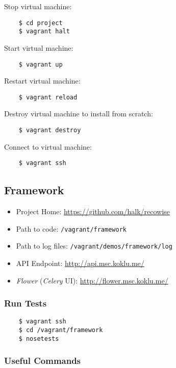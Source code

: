 Stop virtual machine:

\begin{verbatim}
    $ cd project
    $ vagrant halt
\end{verbatim}

Start virtual machine:

\begin{verbatim}
    $ vagrant up
\end{verbatim}

Restart virtual machine:

\begin{verbatim}
    $ vagrant reload
\end{verbatim}

Destroy virtual machine to install from scratch:

\begin{verbatim}
    $ vagrant destroy
\end{verbatim}

Connect to virtual machine:

\begin{verbatim}
    $ vagrant ssh
\end{verbatim}


\subsection{Framework}

\begin{itemize}
\item Project Home: \url{https://github.com/halk/recowise}
\item Path to code: \texttt{/vagrant/framework}
\item Path to log files: \texttt{/vagrant/demos/framework/log}
\item API Endpoint: \url{http://api.msc.koklu.me/}
\item \emph{Flower} (\emph{Celery} UI): \url{http://flower.msc.koklu.me/}
\end{itemize}

\subsubsection{Run Tests}

\begin{verbatim}
    $ vagrant ssh
    $ cd /vagrant/framework
    $ nosetests
\end{verbatim}

\subsubsection{Useful Commands}

